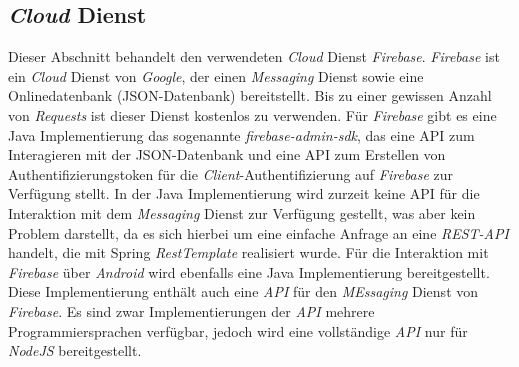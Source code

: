 \subsection{\emph{Cloud} Dienst}
Dieser Abschnitt behandelt den verwendeten \emph{Cloud} Dienst \emph{Firebase}. \emph{Firebase} ist ein \emph{Cloud} Dienst von \emph{Google}, der einen \emph{Messaging} Dienst sowie eine Onlinedatenbank (JSON-Datenbank) bereitstellt. Bis zu einer gewissen Anzahl von \emph{Requests} ist dieser Dienst kostenlos zu verwenden.  
\newline
\newline
Für \emph{Firebase} gibt es eine Java Implementierung das sogenannte \emph{firebase-admin-sdk}, das eine API zum Interagieren mit der JSON-Datenbank und eine API zum Erstellen von Authentifizierungstoken für die \emph{Client}-Authentifizierung auf \emph{Firebase} zur Verfügung stellt. In der Java Implementierung wird zurzeit keine API für die Interaktion mit dem \emph{Messaging} Dienst zur Verfügung gestellt, was aber kein Problem darstellt, da es sich hierbei um eine einfache Anfrage an eine \emph{REST-API} handelt, die mit Spring \emph{RestTemplate} realisiert wurde.
\newline
\newline
Für die Interaktion mit \emph{Firebase} über \emph{Android} wird ebenfalls eine Java Implementierung bereitgestellt. Diese Implementierung enthält auch eine \emph{API} für den \emph{MEssaging} Dienst von \emph{Firebase}.
\newline
\newline
Es sind zwar Implementierungen der \emph{API} mehrere Programmiersprachen verfügbar, jedoch wird eine vollständige \emph{API} nur für \emph{NodeJS} bereitgestellt.

